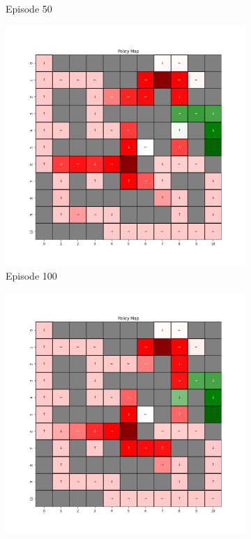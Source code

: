 \documentclass{assignment}
\begin{document}
\begin{figure}[H]
\begin{subfigure}{0.3\textwidth}
    \caption{Episode 50}
    \end{subfigure}\hfill
    \begin{subfigure}{0.3\textwidth}
        \includegraphics[width=\textwidth]{figures/policy_td/alpha_sweep/policy_alpha_1_gamma_0.95_epsilon_0.2_iteration_100.png}
    \caption{Episode 100}
    \end{subfigure}
    \begin{subfigure}{0.3\textwidth}
        \includegraphics[width=\textwidth]{figures/policy_td/alpha_sweep/policy_alpha_1_gamma_0.95_epsilon_0.2_iteration_1000.png}

\end{subfigure}
\end{figure}
\end{document}
